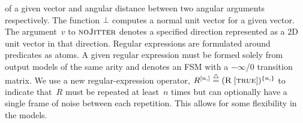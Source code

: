 of a given vector and angular distance between two angular arguments
respectively.
%
The function $\operatorname*{\perp\hspace*{-0.5pt}}$ computes a normal unit vector for a given vector.
%
The argument~$v$ to $\textsc{noJitter}$ denotes a specified direction
represented as a 2D unit vector in that direction.
%
Regular expressions are formulated around predicates as atoms.
%
A given regular expression must be formed solely from output models of the same
arity and denotes an FSM with a $-\infty$/0 transition matrix.
%
We use a new regular-expression operator,
$R^{[n,]}\stackrel{\triangle}{=}(\textsc{R}\;[\textsc{true}])^{\{n,\}}$ to indicate that~$R$
must be repeated at least~$n$ times but can optionally have a single frame of
noise between each repetition.
%
This allows for some flexibility in the models.

\begin{table}
  \caption{The finite-state recognizers corresponding to the lexicon in
    Table~\protect\ref{tab-st1:language}(a).}
  \label{tab-st1:predicates}
  \centering
\end{table}
